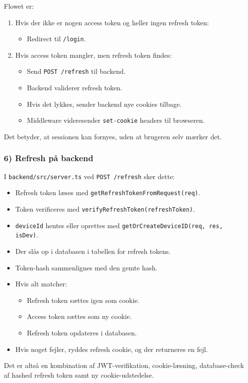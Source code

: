 Flowet er:
\begin{enumerate}
    \item Hvis der ikke er nogen access token og heller ingen refresh token:
    \begin{itemize}
        \item Redirect til \texttt{/login}.
    \end{itemize}
    \item Hvis access token mangler, men refresh token findes:
    \begin{itemize}
        \item Send \texttt{POST /refresh} til backend.
        \item Backend validerer refresh token.
        \item Hvis det lykkes, sender backend nye cookies tilbage.
        \item Middleware videresender \texttt{set-cookie} headers til browseren.
    \end{itemize}
\end{enumerate}
Det betyder, at sessionen kan fornyes, uden at brugeren selv mærker det.

\subsubsection{6) Refresh på backend}
I \texttt{backend/src/server.ts} ved \texttt{POST /refresh} sker dette:
\begin{itemize}
    \item Refresh token læses med \texttt{getRefreshTokenFromRequest(req)}.
    \item Token verificeres med \texttt{verifyRefreshToken(refreshToken)}.
    \item \texttt{deviceId} hentes eller oprettes med \texttt{getOrCreateDeviceID(req, res, isDev)}.
    \item Der slås op i databasen i tabellen for refresh tokens.
    \item Token-hash sammenlignes med den gemte hash.
    \item Hvis alt matcher:
    \begin{itemize}
        \item Refresh token sættes igen som cookie.
        \item Access token sættes som ny cookie.
        \item Refresh token opdateres i databasen.
    \end{itemize}
    \item Hvis noget fejler, ryddes refresh cookie, og der returneres en fejl.
\end{itemize}
Det er altså en kombination af JWT-verifikation, cookie-læsning, database-check af hashed refresh token samt ny cookie-udstedelse.

